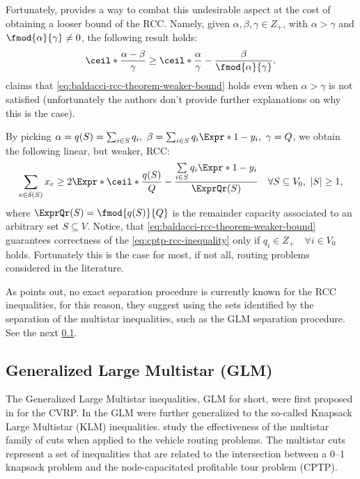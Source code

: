Fortunately, \textcite{baldacci2007capacitated} provides a way to
combat this undesirable aspect at the cost of obtaining a looser bound of the RCC.
Namely, given $\alpha, \beta, \gamma \in Z_+$, with $\alpha > \gamma$ and
$\fmod{\alpha}{\gamma} \ne 0$, the following result holds:
\begin{equation}
	\label{eq:baldacci-rcc-theorem-weaker-bound}
	\ceil*{\frac{\alpha - \beta}{\gamma}} \ge \ceil*{\frac{\alpha}{\gamma}} - \frac{\beta}{\fmod{\alpha}{\gamma}}.
\end{equation}
\textcite{jepsen2014} claims that \cref{eq:baldacci-rcc-theorem-weaker-bound}
holds even when $\alpha > \gamma$ is not satisfied
(unfortunately the authors don't provide further explanations on why this is the case).

By picking $\alpha = q(S) = \sum_{i \in S} q_i,\ \beta = \sum_{i \in S} q_i\Expr*{1 - y_i},\ \gamma = Q$,
we obtain the following linear, but weaker, RCC:
\begin{equation}
	\label{eq:cptp-rcc-inequality}
	\sum\limits_{e \in \delta(S)} x_e \ge 2 \Expr*{\ceil*{\frac{q(S)}{Q}} - \frac{\sum\limits_{i \in S} q_i \Expr*{1 - y_i}}{\ExprQr(S)}} \quad \forall S \subseteq V_0,\ |S| \ge 1,
\end{equation}
where $\ExprQr(S) = \fmod{q(S)}{Q}$ is the remainder capacity associated
to an arbitrary set $S \subseteq V$.
Notice, that \cref{eq:baldacci-rcc-theorem-weaker-bound} guarantees correctness
of the \cref{eq:cptp-rcc-inequality} only if $q_i \in Z_+ \quad \forall i \in V_0$ holds.
Fortunately this is the case for most, if not all, routing problems considered in the literature.

As \textcite{jepsen2014} points out,
no exact separation procedure is currently known for the RCC inequalities,
for this reason,
they suggest using the sets identified by the separation of the multistar inequalities,
such as the GLM separation procedure.
See the next \cref{sec:cptp-glm}.

\subsection{Generalized Large Multistar (GLM)}
\label{sec:cptp-glm}

The Generalized Large Multistar inequalities,
GLM for short,
were first proposed in \textcite{gouveia1995} for the CVRP.
In \textcite{letchford2002}
the GLM were further generalized to the so-called Knapsack Large Multistar (KLM) inequalities.
\textcite{letchford2006} study the effectiveness of the multistar family of cuts
when applied to the vehicle routing problems.
The multistar cuts represent a set of inequalities that are related to
the intersection between a 0--1 knapsack problem and the node-capacitated profitable tour problem (CPTP).


